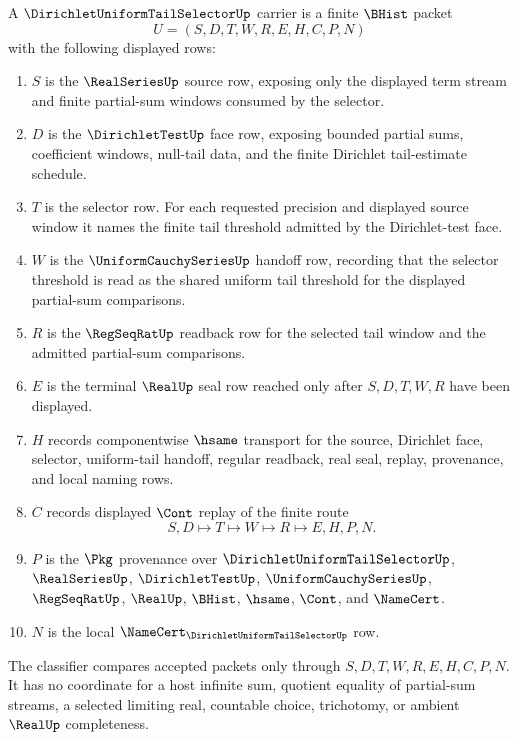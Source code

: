 \begin{definition}
\label{def:dirichlet-uniform-tail-selector-carrier}
A $\DirichletUniformTailSelectorUp$ carrier is a finite $\BHist$ packet
$$
U=(S,D,T,W,R,E,H,C,P,N)
$$
with the following displayed rows:
\begin{enumerate}
\item $S$ is the $\RealSeriesUp$ source row, exposing only the displayed term stream and finite partial-sum windows consumed by the selector.
\item $D$ is the $\DirichletTestUp$ face row, exposing bounded partial sums, coefficient windows, null-tail data, and the finite Dirichlet tail-estimate schedule.
\item $T$ is the selector row. For each requested precision and displayed source window it names the finite tail threshold admitted by the Dirichlet-test face.
\item $W$ is the $\UniformCauchySeriesUp$ handoff row, recording that the selector threshold is read as the shared uniform tail threshold for the displayed partial-sum comparisons.
\item $R$ is the $\RegSeqRatUp$ readback row for the selected tail window and the admitted partial-sum comparisons.
\item $E$ is the terminal $\RealUp$ seal row reached only after $S,D,T,W,R$ have been displayed.
\item $H$ records componentwise $\hsame$ transport for the source, Dirichlet face, selector, uniform-tail handoff, regular readback, real seal, replay, provenance, and local naming rows.
\item $C$ records displayed $\Cont$ replay of the finite route
$$
S,D \longmapsto T \longmapsto W \longmapsto R \longmapsto E,H,P,N .
$$
\item $P$ is the $\Pkg$ provenance over $\DirichletUniformTailSelectorUp$, $\RealSeriesUp$, $\DirichletTestUp$, $\UniformCauchySeriesUp$, $\RegSeqRatUp$, $\RealUp$, $\BHist$, $\hsame$, $\Cont$, and $\NameCert$.
\item $N$ is the local $\NameCert_{\DirichletUniformTailSelectorUp}$ row.
\end{enumerate}
The classifier compares accepted packets only through $S,D,T,W,R,E,H,C,P,N$. It has no coordinate for a host infinite sum, quotient equality of partial-sum streams, a selected limiting real, countable choice, trichotomy, or ambient $\RealUp$ completeness.
\end{definition}

